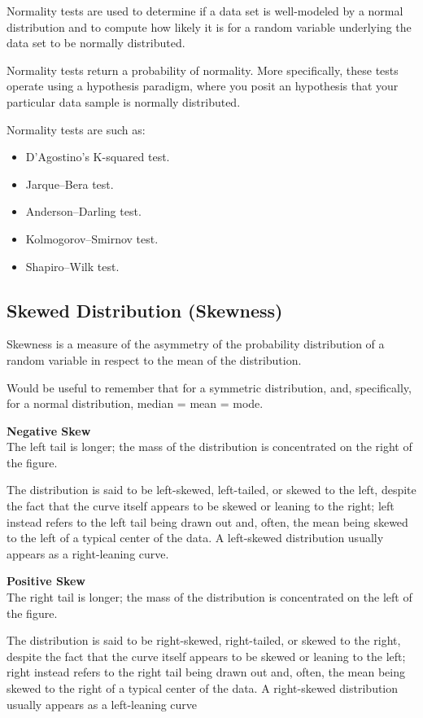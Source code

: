 \documentclass{article}
\begin{document}
Normality tests are used to determine if a data set is well-modeled by a normal distribution and to compute how likely it is for a random variable underlying the data set to be normally distributed. 

Normality tests return a probability of normality. More specifically, these tests operate using a hypothesis paradigm, where you posit an hypothesis that your particular data sample is normally distributed. 

Normality tests are such as:
\begin{itemize}
    \item D'Agostino's K-squared test.
    \item Jarque–Bera test.
    \item Anderson–Darling test.
    \item Kolmogorov–Smirnov test.
    \item Shapiro–Wilk test.
\end{itemize}

\subsection{Skewed Distribution (Skewness)}
Skewness is a measure of the asymmetry of the probability distribution of a random variable in respect to the mean of the distribution. 

Would be useful to remember that for a symmetric distribution, and, specifically, for a normal distribution, median = mean = mode.

\textbf{Negative Skew} \\
The left tail is longer; the mass of the distribution is concentrated on the right of the figure. 

The distribution is said to be left-skewed, left-tailed, or skewed to the left, despite the fact that the curve itself appears to be skewed or leaning to the right; left instead refers to the left tail being drawn out and, often, the mean being skewed to the left of a typical center of the data. A left-skewed distribution usually appears as a right-leaning curve.

\textbf{Positive Skew} \\
The right tail is longer; the mass of the distribution is concentrated on the left of the figure. 

The distribution is said to be right-skewed, right-tailed, or skewed to the right, despite the fact that the curve itself appears to be skewed or leaning to the left; right instead refers to the right tail being drawn out and, often, the mean being skewed to the right of a typical center of the data. A right-skewed distribution usually appears as a left-leaning curve
\end{document}
